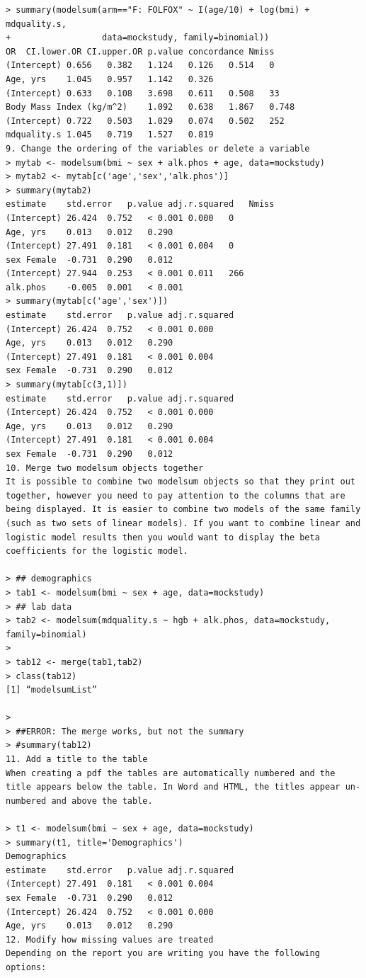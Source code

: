 \documentclass[
]{book}
\begin{document}
\begin{verbatim}
> summary(modelsum(arm=="F: FOLFOX" ~ I(age/10) + log(bmi) + mdquality.s,
+                  data=mockstudy, family=binomial))
OR  CI.lower.OR CI.upper.OR p.value concordance Nmiss
(Intercept) 0.656   0.382   1.124   0.126   0.514   0
Age, yrs    1.045   0.957   1.142   0.326       
(Intercept) 0.633   0.108   3.698   0.611   0.508   33
Body Mass Index (kg/m^2)    1.092   0.638   1.867   0.748       
(Intercept) 0.722   0.503   1.029   0.074   0.502   252
mdquality.s 1.045   0.719   1.527   0.819       
9. Change the ordering of the variables or delete a variable
> mytab <- modelsum(bmi ~ sex + alk.phos + age, data=mockstudy)
> mytab2 <- mytab[c('age','sex','alk.phos')]
> summary(mytab2)
estimate    std.error   p.value adj.r.squared   Nmiss
(Intercept) 26.424  0.752   < 0.001 0.000   0
Age, yrs    0.013   0.012   0.290       
(Intercept) 27.491  0.181   < 0.001 0.004   0
sex Female  -0.731  0.290   0.012       
(Intercept) 27.944  0.253   < 0.001 0.011   266
alk.phos    -0.005  0.001   < 0.001     
> summary(mytab[c('age','sex')])
estimate    std.error   p.value adj.r.squared
(Intercept) 26.424  0.752   < 0.001 0.000
Age, yrs    0.013   0.012   0.290   
(Intercept) 27.491  0.181   < 0.001 0.004
sex Female  -0.731  0.290   0.012   
> summary(mytab[c(3,1)])
estimate    std.error   p.value adj.r.squared
(Intercept) 26.424  0.752   < 0.001 0.000
Age, yrs    0.013   0.012   0.290   
(Intercept) 27.491  0.181   < 0.001 0.004
sex Female  -0.731  0.290   0.012   
10. Merge two modelsum objects together
It is possible to combine two modelsum objects so that they print out together, however you need to pay attention to the columns that are being displayed. It is easier to combine two models of the same family (such as two sets of linear models). If you want to combine linear and logistic model results then you would want to display the beta coefficients for the logistic model.

> ## demographics
> tab1 <- modelsum(bmi ~ sex + age, data=mockstudy)
> ## lab data
> tab2 <- modelsum(mdquality.s ~ hgb + alk.phos, data=mockstudy, family=binomial)
>                 
> tab12 <- merge(tab1,tab2)
> class(tab12)
[1] “modelsumList”

> 
> ##ERROR: The merge works, but not the summary
> #summary(tab12)
11. Add a title to the table
When creating a pdf the tables are automatically numbered and the title appears below the table. In Word and HTML, the titles appear un-numbered and above the table.

> t1 <- modelsum(bmi ~ sex + age, data=mockstudy)
> summary(t1, title='Demographics')
Demographics
estimate    std.error   p.value adj.r.squared
(Intercept) 27.491  0.181   < 0.001 0.004
sex Female  -0.731  0.290   0.012   
(Intercept) 26.424  0.752   < 0.001 0.000
Age, yrs    0.013   0.012   0.290   
12. Modify how missing values are treated
Depending on the report you are writing you have the following options:


\end{verbatim}
\end{document}
